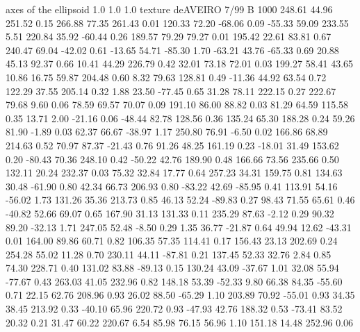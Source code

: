 axes of the ellipsoid
  1.0  1.0  1.0
texture deAVEIRO 7/99
B   1000
  248.61   44.96  251.52    0.15
  266.88   77.35  261.43    0.01
  120.33   72.20  -68.06    0.09
  -55.33   59.09  233.55    5.51
  220.84   35.92  -60.44    0.26
  189.57   79.29   79.27    0.01
  195.42   22.61   83.81    0.67
  240.47   69.04  -42.02    0.61
  -13.65   54.71  -85.30    1.70
  -63.21   43.76  -65.33    0.69
   20.88   45.13   92.37    0.66
   10.41   44.29  226.79    0.42
   32.01   73.18   72.01    0.03
  199.27   58.41   43.65   10.86
   16.75   59.87  204.48    0.60
    8.32   79.63  128.81    0.49
  -11.36   44.92   63.54    0.72
  122.29   37.55  205.14    0.32
    1.88   23.50  -77.45    0.65
   31.28   78.11  222.15    0.27
  222.67   79.68    9.60    0.06
   78.59   69.57   70.07    0.09
  191.10   86.00   88.82    0.03
   81.29   64.59  115.58    0.35
   13.71    2.00  -21.16    0.06
  -48.44   82.78  128.56    0.36
  135.24   65.30  188.28    0.24
   59.26   81.90   -1.89    0.03
   62.37   66.67  -38.97    1.17
  250.80   76.91   -6.50    0.02
  166.86   68.89  214.63    0.52
   70.97   87.37  -21.43    0.76
   91.26   48.25  161.19    0.23
  -18.01   31.49  153.62    0.20
  -80.43   70.36  248.10    0.42
  -50.22   42.76  189.90    0.48
  166.66   73.56  235.66    0.50
  132.11   20.24  232.37    0.03
   75.32   32.84   17.77    0.64
  257.23   34.31  159.75    0.81
  134.63   30.48  -61.90    0.80
   42.34   66.73  206.93    0.80
  -83.22   42.69  -85.95    0.41
  113.91   54.16  -56.02    1.73
  131.26   35.36  213.73    0.85
   46.13   52.24  -89.83    0.27
   98.43   71.55   65.61    0.46
  -40.82   52.66   69.07    0.65
  167.90   31.13  131.33    0.11
  235.29   87.63   -2.12    0.29
   90.32   89.20  -32.13    1.71
  247.05   52.48   -8.50    0.29
    1.35   36.77  -21.87    0.64
   49.94   12.62  -43.31    0.01
  164.00   89.86   60.71    0.82
  106.35   57.35  114.41    0.17
  156.43   23.13  202.69    0.24
  254.28   55.02   11.28    0.70
  230.11   44.11  -87.81    0.21
  137.45   52.33   32.76    2.84
    0.85   74.30  228.71    0.40
  131.02   83.88  -89.13    0.15
  130.24   43.09  -37.67    1.01
   32.08   55.94  -77.67    0.43
  263.03   41.05  232.96    0.82
  148.18   53.39  -52.33    9.80
   66.38   84.35  -55.60    0.71
   22.15   62.76  208.96    0.93
   26.02   88.50  -65.29    1.10
  203.89   70.92  -55.01    0.93
   34.35   38.45  213.92    0.33
  -40.10   65.96  220.72    0.93
  -47.93   42.76  188.32    0.53
  -73.41   83.52   20.32    0.21
   31.47   60.22  220.67    6.54
   85.98   76.15   56.96    1.10
  151.18   14.48  252.96    0.06
